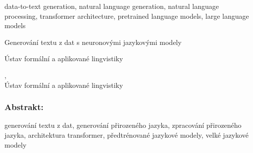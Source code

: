 \documentclass[12pt,notitlepage,a4paper,openright]{report}
\begin{document}


\begin{description}[leftmargin=7.5em,labelwidth=7em,labelindent=0em,labelsep=0.5em]
    \item[Keywords:] data-to-text generation, natural language generation, natural language processing, transformer architecture, pretrained language models, large language models
\end{description}


\cleardoublepage{}
\begin{description}[leftmargin=7.5em,labelwidth=7em,labelindent=0em,labelsep=0.5em]
    \item[Název práce:] Generování textu z dat s neuronovými jazykovými modely
    \item[Autor:] \theauthor{}
    \item[Katedra:] Ústav formální a aplikované lingvistiky
    \item[Vedoucí práce:] \thesupervisor,\\ Ústav formální a aplikované lingvistiky
\end{description}

\subsubsection{Abstrakt:}



\begin{description}[leftmargin=7.5em,labelwidth=7em,labelindent=0em,labelsep=0.5em]
    \item[Klíčová slova:] generování textu z dat, generování přirozeného jazyka, zpracování přirozeného jazyka, architektura transformer, předtrénované jazykové modely, velké jazykové modely
\end{description}





\cleardoublepage{}
\ \vspace{10mm}

\end{document}
